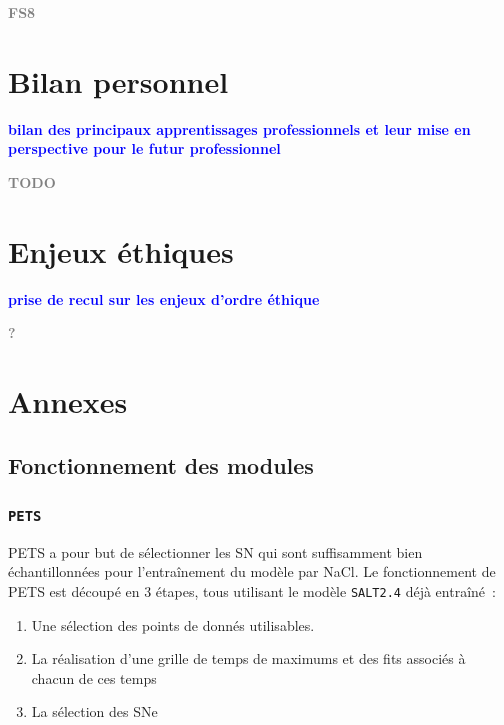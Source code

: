\documentclass{book}
\newcommand{\todo}[1]{{\textcolor{gray}{\bf \large #1}}}
\newcommand{\consignes}[1]{{\textcolor{blue}{\bf \large #1}}}
\def\pets{\texttt{PETS}\xspace}
\def\saltd{\texttt{SALT2.4}\xspace}
\begin{document}
\todo{FS8}

\chapter{Bilan personnel}
\consignes{bilan des principaux apprentissages professionnels et leur mise en perspective pour le futur professionnel}

\todo{TODO}

\chapter{Enjeux éthiques}
\consignes{prise de recul sur les enjeux d’ordre éthique}

\todo{?}

\appendix
\chapter{Annexes}

\section{Fonctionnement des modules}

\subsection{\pets}
\label{anx:pets}

PETS a pour but de sélectionner les SN qui sont suffisamment bien échantillonnées pour l'entraînement du modèle par NaCl.
Le fonctionnement de PETS est découpé en 3 étapes, tous utilisant le modèle \saltd déjà entraîné~:
\begin{enumerate}
\item Une sélection des points de donnés utilisables.
\item La réalisation d'une grille de temps de maximums et des fits associés à chacun de ces temps
\item La sélection des SNe
\end{enumerate}
\end{document}
